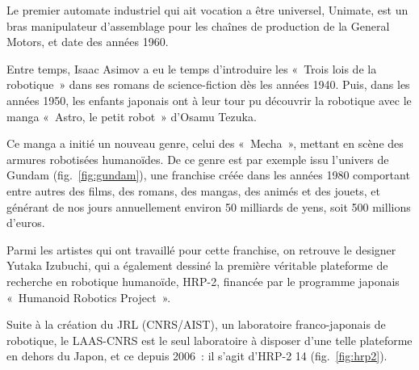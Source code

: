 \documentclass[french,A4paper,]{book}
\begin{document}
Le premier automate industriel qui ait vocation a être universel,
Unimate, est un bras manipulateur d'assemblage pour les chaînes de
production de la General Motors, et date des années 1960.

Entre temps, Isaac Asimov a eu le temps d'introduire les «~Trois lois de
la robotique~» dans ses romans de science-fiction dès les années 1940.
Puis, dans les années 1950, les enfants japonais ont à leur tour pu
découvrir la robotique avec le manga «~Astro, le petit robot~» d'Osamu
Tezuka.

Ce manga a initié un nouveau genre, celui des «~Mecha~», mettant en
scène des armures robotisées humanoïdes. De ce genre est par exemple
issu l'univers de Gundam (fig.~\ref{fig:gundam}), une franchise créée
dans les années 1980 comportant entre autres des films, des romans, des
mangas, des animés et des jouets, et générant de nos jours annuellement
environ 50 milliards de yens, soit 500 millions d'euros.

Parmi les artistes qui ont travaillé pour cette franchise, on retrouve
le designer Yutaka Izubuchi, qui a également dessiné la première
véritable plateforme de recherche en robotique humanoïde, HRP-2,
financée par le programme japonais «~Humanoid Robotics Project~».

Suite à la création du JRL (CNRS/AIST), un laboratoire franco-japonais
de robotique, le LAAS-CNRS est le seul laboratoire à disposer d'une
telle plateforme en dehors du Japon, et ce depuis 2006~: il s'agit
d'HRP-2 14 (fig.~\ref{fig:hrp2}).
\end{document}
